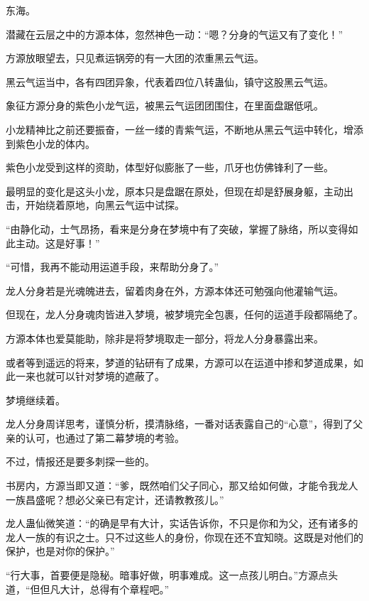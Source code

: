 
\begin{this_body}



东海。

潜藏在云层之中的方源本体，忽然神色一动：“嗯？分身的气运又有了变化！”

方源放眼望去，只见煮运锅旁的有一大团的浓重黑云气运。

黑云气运当中，各有四团异象，代表着四位八转蛊仙，镇守这股黑云气运。

象征方源分身的紫色小龙气运，被黑云气运团团围住，在里面盘踞低吼。

小龙精神比之前还要振奋，一丝一缕的青紫气运，不断地从黑云气运中转化，增添到紫色小龙的体内。

紫色小龙受到这样的资助，体型好似膨胀了一些，爪牙也仿佛锋利了一些。

最明显的变化是这头小龙，原本只是盘踞在原处，但现在却是舒展身躯，主动出击，开始绕着原地，向黑云气运中试探。

“由静化动，士气昂扬，看来是分身在梦境中有了突破，掌握了脉络，所以变得如此主动。这是好事！”

“可惜，我再不能动用运道手段，来帮助分身了。”

龙人分身若是光魂魄进去，留着肉身在外，方源本体还可勉强向他灌输气运。

但现在，龙人分身魂肉皆进入梦境，被梦境完全包裹，任何的运道手段都隔绝了。

方源本体也爱莫能助，除非是将梦境取走一部分，将龙人分身暴露出来。

或者等到遥远的将来，梦道的钻研有了成果，方源可以在运道中掺和梦道成果，如此一来也就可以针对梦境的遮蔽了。

梦境继续着。

龙人分身周详思考，谨慎分析，摸清脉络，一番对话表露自己的“心意”，得到了父亲的认可，也通过了第二幕梦境的考验。

不过，情报还是要多刺探一些的。

书房内，方源当即又道：“爹，既然咱们父子同心，那又给如何做，才能令我龙人一族昌盛呢？想必父亲已有定计，还请教教孩儿。”

龙人蛊仙微笑道：“的确是早有大计，实话告诉你，不只是你和为父，还有诸多的龙人一族的有识之士。只不过这些人的身份，你现在还不宜知晓。这既是对他们的保护，也是对你的保护。”

“行大事，首要便是隐秘。暗事好做，明事难成。这一点孩儿明白。”方源点头道，“但但凡大计，总得有个章程吧。”


\end{this_body}
